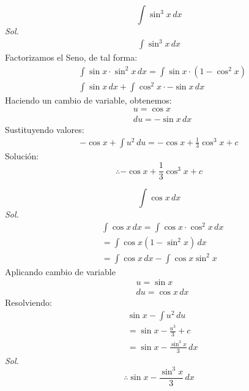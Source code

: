\begin{problem}
    \begin{equation*}
        \int \sin^3{x}\,dx
    \end{equation*}
    \textit{ Sol. }
    \begin{align*}
        \int \sin^3{x}\,dx
    \end{align*}
    Factorizamos el Seno, de tal forma:
    \begin{align*}
        &\int \sin{x}\cdot \sin^2{x}\,dx  =  \int \sin{x}\cdot \left(1 -\cos^2{x}\right)\\
        &\int \sin {x}\,dx + \int{\cos^2{x}\cdot -\sin{x}}\,dx
    \end{align*}
    Haciendo un cambio de variable, obtenemos:
    \begin{align*}
        &u = \cos{x}\\
        &du = -\sin{x}\,dx 
    \end{align*}
    Sustituyendo valores:
    \begin{align*}
        - \cos{x} + \int u^2\,du = -\cos{x} + \frac{1}{3}\cos^3{x} + c
    \end{align*}
    Solución:
    \begin{equation*}
        \therefore -\cos{x} + \frac{1}{3}\cos^3{x} + c
    \end{equation*}
    
\end{problem}


\begin{problem}
    \begin{equation*}
        \int \cos{x}\,dx
    \end{equation*}
\textit{ Sol. }
\begin{align*}
    &\int \cos{x}\,dx =\int \cos{x} \cdot  \cos^2{x}\,dx\\
    &=\int \cos{x}\left(1 - \sin^2{x}  \right)\,dx\\
    &=\int \cos{x}\, dx - \int \cos{x} \sin^2{x}  
\end{align*}
Aplicando cambio de variable
\begin{align*}
    &u = \sin{x}\\
    &du = \cos{x}\,dx
\end{align*}
Resolviendo: 
\begin{align*}
    &\sin{x} - \int u^2\,du\\
    &= \sin{x} - \frac{u^3}{3} + c \\
    &= \sin {x} - \frac{\sin^3{x}}{3}\, dx 
\end{align*}
\textit{ Sol. }
\begin{equation}
    \therefore \sin {x} - \frac{\sin^3{x}}{3}\, dx 
\end{equation}
\end{problem}


